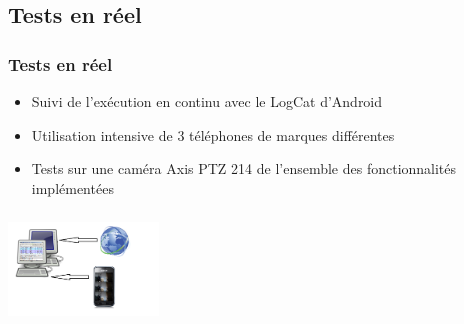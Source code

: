 \subsection{Tests en réel}
 \begin{frame}
\begin{minipage}{0.59\textwidth}
   \frametitle{Tests en réel}
\begin{itemize}
    \item Suivi de l'exécution en continu avec le LogCat d'Android
    \item Utilisation intensive de 3 téléphones de marques différentes
    \item Tests sur une caméra Axis PTZ 214 de l'ensemble des
    fonctionnalités implémentées
   \end{itemize}
\end{minipage}
\begin{minipage}{0.39\textwidth}
 \includegraphics[width=4cm, height=3cm]{Images/ImageSlide13.png}
\end{minipage}
\end{frame}